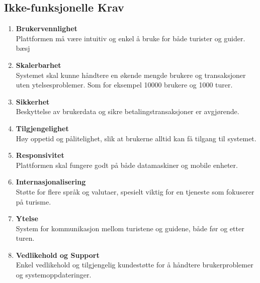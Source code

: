 \documentclass[../doc.tex]{subfiles}
\begin{document}
\subsection{Ikke-funksjonelle Krav}
\begin{enumerate}
    \item \textbf{Brukervennlighet} \\
    Plattformen må være intuitiv og enkel å bruke for både turister og guider. bæsj

    \item \textbf{Skalerbarhet} \\
    Systemet skal kunne håndtere en økende mengde brukere og transaksjoner uten ytelsesproblemer. Som for eksempel 10000 brukere og 1000 turer.

    \item \textbf{Sikkerhet} \\
    Beskyttelse av brukerdata og sikre betalingstransaksjoner er avgjørende.

    \item \textbf{Tilgjengelighet} \\ 
    Høy oppetid og pålitelighet, slik at brukerne alltid kan få tilgang til systemet.

    \item \textbf{Responsivitet} \\
    Plattformen skal fungere godt på både datamaskiner og mobile enheter.

    \item \textbf{Internasjonalisering} \\
    Støtte for flere språk og valutaer, spesielt viktig for en tjeneste som fokuserer på turisme.

    \item \textbf{Ytelse} \\
    System for kommunikasjon mellom turistene og guidene, både før og etter turen.

    \item \textbf{Vedlikehold og Support} \\
    Enkel vedlikehold og tilgjengelig kundestøtte for å håndtere brukerproblemer og systemoppdateringer.
\end{enumerate}
\end{document}
